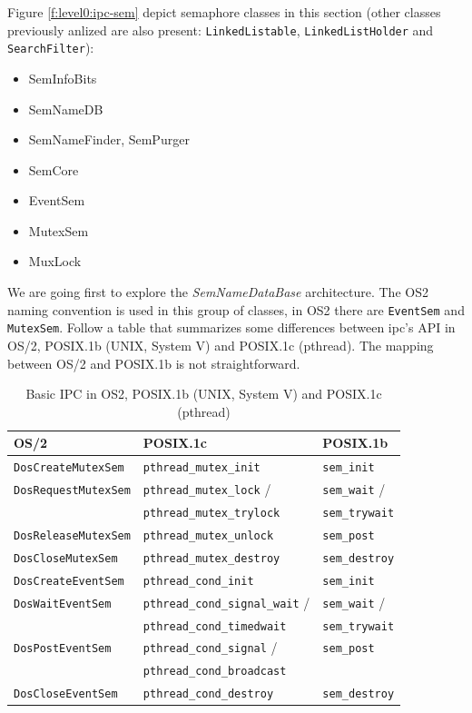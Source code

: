 Figure \ref{f:level0:ipc-sem} depict semaphore classes in this section (other classes previously anlized are also present: \texttt{LinkedListable}, \texttt{LinkedListHolder} and \texttt{SearchFilter}):
\begin{itemize}
 \item SemInfoBits
 \item SemNameDB
 \item SemNameFinder, SemPurger

 \item SemCore
 \item EventSem
 \item MutexSem
 \item MuxLock
\end{itemize}

We are going first to explore the \textit{SemNameDataBase} architecture. The OS2 naming convention is used in this group of classes, in OS2 there are \texttt{EventSem} and \texttt{MutexSem}. Follow a table that summarizes some differences between ipc's API in OS/2, POSIX.1b (UNIX, System V) and POSIX.1c (pthread). The mapping between OS/2 and POSIX.1b is not straightforward.

\begin{table}[!h]
 \begin{center}
  \begin{tabular}{|l|l|l|}
   \hline
    OS/2 & POSIX.1c & POSIX.1b \\
   \hline
    \texttt{DosCreateMutexSem} & \texttt{pthread\_mutex\_init} & \texttt{sem\_init} \\
   \hline
    \texttt{DosRequestMutexSem} & \texttt{pthread\_mutex\_lock} / & \texttt{sem\_wait} / \\
     & \texttt{pthread\_mutex\_trylock} & \texttt{sem\_trywait} \\
   \hline
    \texttt{DosReleaseMutexSem} & \texttt{pthread\_mutex\_unlock} & \texttt{sem\_post} \\
   \hline
    \texttt{DosCloseMutexSem} & \texttt{pthread\_mutex\_destroy} & \texttt{sem\_destroy} \\
   \hline
    \texttt{DosCreateEventSem} & \texttt{pthread\_cond\_init} & \texttt{sem\_init} \\
   \hline
    \texttt{DosWaitEventSem} & \texttt{pthread\_cond\_signal\_wait} / & \texttt{sem\_wait} / \\
     & \texttt{pthread\_cond\_timedwait} & \texttt{sem\_trywait} \\
   \hline
    \texttt{DosPostEventSem} & \texttt{pthread\_cond\_signal} / & \texttt{sem\_post} \\
     & \texttt{pthread\_cond\_broadcast} & \\
   \hline
    \texttt{DosCloseEventSem} & \texttt{pthread\_cond\_destroy} & \texttt{sem\_destroy} \\
   \hline
   \end{tabular}
   \end{center}
  \caption{Basic IPC in OS2, POSIX.1b (UNIX, System V) and POSIX.1c (pthread)}
 \label{t:ipc_api}
\end{table}

